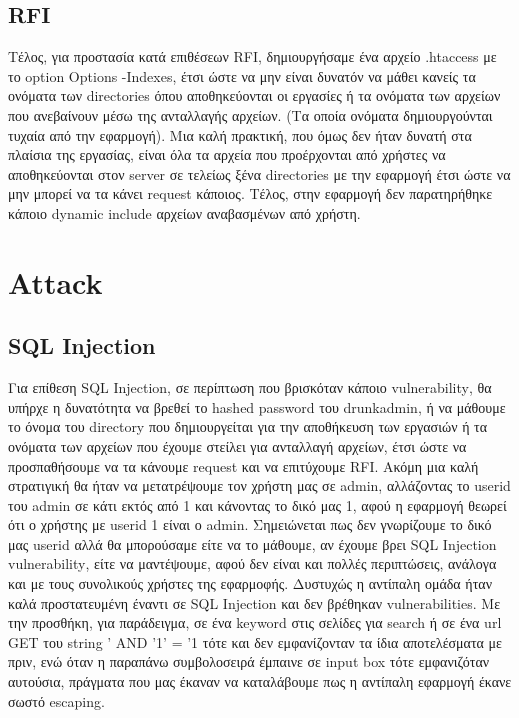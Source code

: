 \documentclass{article}
\begin{document}
\subsection*{\textlatin{RFI}}
Τέλος, για προστασία κατά επιθέσεων \textlatin{RFI}, δημιουργήσαμε ένα αρχείο \textlatin{.htaccess} με το \textlatin{option Options -Indexes}, έτσι ώστε να μην είναι δυνατόν να μάθει κανείς τα ονόματα των \textlatin{directories} όπου αποθηκεύονται οι εργασίες ή τα ονόματα των αρχείων που ανεβαίνουν μέσω της ανταλλαγής αρχείων. (Τα οποία ονόματα δημιουργούνται τυχαία από την εφαρμογή). Μια καλή πρακτική, που όμως δεν ήταν δυνατή στα πλαίσια της εργασίας, είναι όλα τα αρχεία που προέρχονται από χρήστες να αποθηκεύονται στον \textlatin{server} σε τελείως ξένα \textlatin{directories} με την εφαρμογή έτσι ώστε να μην μπορεί να τα κάνει \textlatin{request} κάποιος. Τέλος, στην εφαρμογή δεν παρατηρήθηκε κάποιο \textlatin{dynamic include} αρχείων αναβασμένων από χρήστη. 








\section*{\textlatin{Attack}}








\subsection*{\textlatin{SQL Injection}}
Για επίθεση \textlatin{SQL Injection}, σε περίπτωση που βρισκόταν κάποιο \textlatin{vulnerability}, θα υπήρχε η δυνατότητα να βρεθεί το \textlatin{hashed password} του \textlatin{drunkadmin}, ή να μάθουμε το όνομα του \textlatin{directory} που δημιουργείται για την αποθήκευση των εργασιών ή τα ονόματα των αρχείων που έχουμε στείλει για ανταλλαγή αρχείων, έτσι ώστε να προσπαθήσουμε να τα κάνουμε \textlatin{request} και να επιτύχουμε \textlatin{RFI}. Ακόμη μια καλή στρατιγική θα ήταν να μετατρέψουμε τον χρήστη μας σε \textlatin{admin}, αλλάζοντας το \textlatin{userid} του \textlatin{admin} σε κάτι εκτός από 1 και κάνοντας το δικό μας 1, αφού η εφαρμογή θεωρεί ότι ο χρήστης με \textlatin{userid} 1 είναι ο \textlatin{admin}. Σημειώνεται πως δεν γνωρίζουμε το δικό μας \textlatin{userid} αλλά θα μπορούσαμε είτε να το μάθουμε, αν έχουμε βρει \textlatin{SQL Injection vulnerability}, είτε να μαντέψουμε, αφού δεν είναι και πολλές περιπτώσεις, ανάλογα και με τους συνολικούς χρήστες της εφαρμοφής. Δυστυχώς η αντίπαλη ομάδα ήταν καλά προστατευμένη έναντι σε \textlatin{SQL Injection} και δεν βρέθηκαν \textlatin{vulnerabilities}. Με την προσθήκη, για παράδειγμα, σε ένα \textlatin{keyword} στις σελίδες για \textlatin{search} ή σε ένα \textlatin{url GET} του \textlatin{string ' AND '1' = '1} τότε και δεν εμφανίζονταν τα ίδια αποτελέσματα με πριν, ενώ όταν η παραπάνω συμβολοσειρά έμπαινε σε \textlatin{input box} τότε εμφανιζόταν αυτούσια, πράγματα που μας έκαναν να καταλάβουμε πως η αντίπαλη εφαρμογή έκανε σωστό \textlatin{escaping}. 
\end{document}
